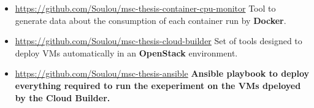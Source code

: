 \begin{itemize}
\item{\url{https://github.com/Soulou/msc-thesis-container-cpu-monitor}\newline\vspace{1em}
Tool to generate data about the consumption of each container run by
\textbf{Docker}.}

\item{\url{https://github.com/Soulou/msc-thesis-cloud-builder}\newline\vspace{1em}
Set of tools designed to deploy VMs automatically in an \textbf{OpenStack}
environment.}

\item{\url{https://github.com/Soulou/msc-thesis-ansible}\newline\vspace{1em}
\textbf{Ansible playbook to deploy everything required to run the exeperiment
on the VMs dpeloyed by the Cloud Builder.}}
\end{itemize}
